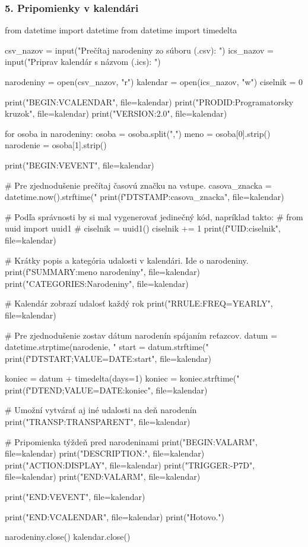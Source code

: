 \subsubsection*{5. Pripomienky v kalendári}

\begin{solution}
from datetime import datetime
from datetime import timedelta

csv_nazov = input("Prečítaj narodeniny zo súboru (.csv): ")
ics_nazov = input("Priprav kalendár s názvom (.ics): ")

narodeniny = open(csv_nazov, "r")
kalendar = open(ics_nazov, "w")
ciselnik = 0

print("BEGIN:VCALENDAR", file=kalendar)
print("PRODID:Programatorsky kruzok", file=kalendar)
print("VERSION:2.0", file=kalendar)

for osoba in narodeniny:
    osoba = osoba.split(",")
    meno = osoba[0].strip()
    narodenie = osoba[1].strip()

    print("BEGIN:VEVENT", file=kalendar)

    # Pre zjednodušenie prečítaj časovú značku na vstupe.
    casova_znacka = datetime.now().strftime("%
    print(f"DTSTAMP:{casova_znacka}", file=kalendar)

    # Podľa správnosti by si mal vygenerovať jedinečný kód, napríklad takto:
    # from uuid import uuid1
    # ciselnik = uuid1()
    ciselnik += 1
    print(f"UID:{ciselnik}", file=kalendar)

    # Krátky popis a kategória udalosti v kalendári. Ide o narodeniny.
    print(f"SUMMARY:{meno} narodeniny", file=kalendar)
    print("CATEGORIES:Narodeniny", file=kalendar)

    # Kalendár zobrazí udalosť každý rok
    print("RRULE:FREQ=YEARLY", file=kalendar)

    # Pre zjednodušenie zostav dátum narodenín spájaním reťazcov.
    datum = datetime.strptime(narodenie, "%
    start = datum.strftime("%
    print(f"DTSTART;VALUE=DATE:{start}", file=kalendar)

    koniec = datum + timedelta(days=1)
    koniec = koniec.strftime("%
    print(f"DTEND;VALUE=DATE:{koniec}", file=kalendar)

    # Umožní vytvárať aj iné udalosti na deň narodenín
    print("TRANSP:TRANSPARENT", file=kalendar)

    # Pripomienka týždeň pred narodeninami
    print("BEGIN:VALARM", file=kalendar)
    print("DESCRIPTION:", file=kalendar)
    print("ACTION:DISPLAY", file=kalendar)
    print("TRIGGER:-P7D", file=kalendar)
    print("END:VALARM", file=kalendar)

    print("END:VEVENT", file=kalendar)

print("END:VCALENDAR", file=kalendar)
print("Hotovo.")

narodeniny.close()
kalendar.close()
\end{solution}


